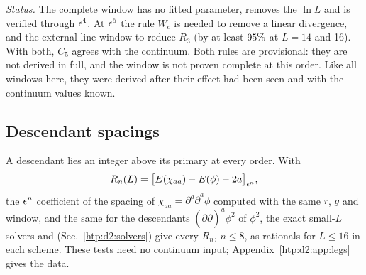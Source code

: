 \emph{Status.} The complete window has no fitted parameter, removes the $\ln L$ and is verified through $\epsilon^4$. At $\epsilon^5$
the rule $W_c$ is needed to remove a linear divergence, and the external-line window to reduce $R_3$ (by at least
$95\%$ at $L=14$ and 16). With both, $C_5$ agrees with the continuum. Both rules are provisional: they are
not derived in full, and the window is not proven complete at this order. Like all windows here, they were derived after
their effect had been seen and with the continuum values known.

\subsection{Descendant spacings}\label{htp:d2:desc}
A descendant lies an integer above its primary at every order. With
\begin{equation}
 R_n(L)=\big[E(\chi_{aa})-E(\phi)-2a\big]_{\epsilon^n},
 \label{htp:d2:eq:R}
\end{equation}
the $\epsilon^n$ coefficient of the spacing of $\chi_{aa}=\partial^a\bar\partial^a\phi$ computed with the same $r$, $g$ and
window, and the same for the descendants $(\partial\bar\partial)^a\phi^2$ of $\phi^2$, the exact small-$L$ solvers
 and  (Sec.~\ref{htp:d2:solvers}) give every $R_n$, $n\le8$, as rationals for $L\le16$ in each
scheme. These tests need no continuum input; Appendix~\ref{htp:d2:app:legs} gives the data.
